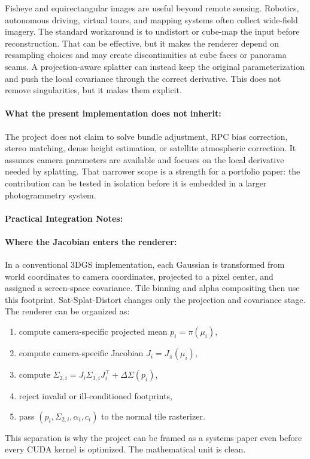 \documentclass{article}
\begin{document}
Fisheye and equirectangular images are useful beyond remote sensing. Robotics, autonomous driving, virtual tours, and mapping systems often collect wide-field imagery. The standard workaround is to undistort or cube-map the input before reconstruction. That can be effective, but it makes the renderer depend on resampling choices and may create discontinuities at cube faces or panorama seams. A projection-aware splatter can instead keep the original parameterization and push the local covariance through the correct derivative. This does not remove singularities, but it makes them explicit.

\paragraph{What the present implementation does not inherit:}

The project does not claim to solve bundle adjustment, RPC bias correction, stereo matching, dense height estimation, or satellite atmospheric correction. It assumes camera parameters are available and focuses on the local derivative needed by splatting. That narrower scope is a strength for a portfolio paper: the contribution can be tested in isolation before it is embedded in a larger photogrammetry system.

\paragraph{Practical Integration Notes:}

\paragraph{Where the Jacobian enters the renderer:}

In a conventional 3DGS implementation, each Gaussian is transformed from world coordinates to camera coordinates, projected to a pixel center, and assigned a screen-space covariance. Tile binning and alpha compositing then use this footprint. Sat-Splat-Distort changes only the projection and covariance stage. The renderer can be organized as:
\begin{enumerate}
  \item compute camera-specific projected mean $p_i=\pi(\mu_i)$,
  \item compute camera-specific Jacobian $J_i=J_{\pi}(\mu_i)$,
  \item compute $\Sigma_{2,i}=J_i\Sigma_{3,i}J_i^\top+\Delta\Sigma(p_i)$,
  \item reject invalid or ill-conditioned footprints,
  \item pass $(p_i,\Sigma_{2,i},\alpha_i,c_i)$ to the normal tile rasterizer.
\end{enumerate}
This separation is why the project can be framed as a systems paper even before every CUDA kernel is optimized. The mathematical unit is clean.
\end{document}
